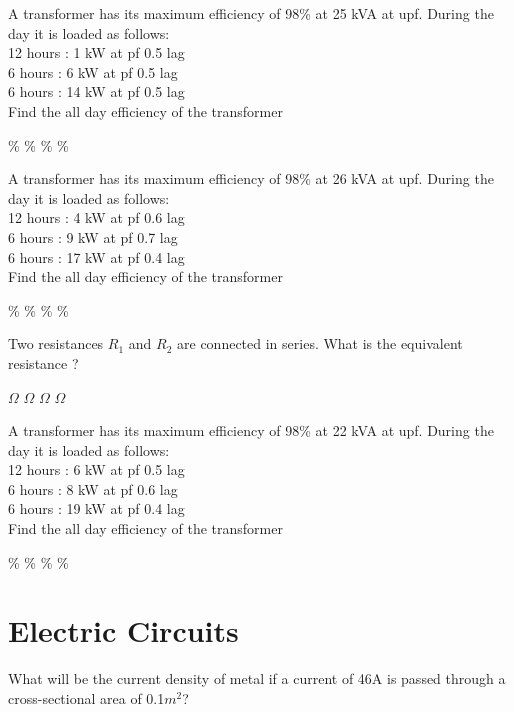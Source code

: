 \documentclass{exam}
\begin{document}
\begin{multicols}{2}
\begin{questions}
\begin{randomizechoices}
\end{randomizechoices}
\question A transformer has its maximum efficiency of 98\% at 25 kVA at upf. During the day it is loaded as follows:\\
12 hours : 1 kW at pf 0.5 lag\\
6 hours : 6 kW at pf 0.5 lag\\
6 hours : 14 kW at pf 0.5 lag\\
Find the all day efficiency of the transformer
\begin{randomizechoices}
 \%
 \%
 \%
 \%
\end{randomizechoices}

\question A transformer has its maximum efficiency of 98\% at 26 kVA at upf. During the day it is loaded as follows:\\
12 hours : 4 kW at pf 0.6 lag\\
6 hours : 9 kW at pf 0.7 lag\\
6 hours : 17 kW at pf 0.4 lag\\
Find the all day efficiency of the transformer
\begin{randomizechoices}
 \%
 \%
 \%
 \%
\end{randomizechoices}

\question Two resistances $R_1$ and $R_2$ are connected in series. What is the equivalent resistance ?

\begin{choices}
  $\Omega$
   $\Omega$
    $\Omega$
 $\Omega$  
\end{choices}

\question A transformer has its maximum efficiency of 98\% at 22 kVA at upf. During the day it is loaded as follows:\\
12 hours : 6 kW at pf 0.5 lag\\
6 hours : 8 kW at pf 0.6 lag\\
6 hours : 19 kW at pf 0.4 lag\\
Find the all day efficiency of the transformer
\begin{randomizechoices}
 \%
 \%
 \%
 \%
\end{randomizechoices}

\section{Electric Circuits}\question
What will be the current density of metal if a current of 46A is passed through a cross-sectional area of 0.1$m^2$?



\end{questions}
\end{multicols}
\end{document}
